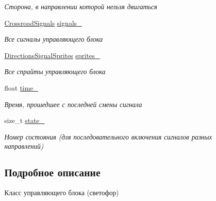 \begin{DoxyCompactItemize}
\begin{DoxyCompactList}\small\item\em Сторона, в направлении которой нельзя двигаться \end{DoxyCompactList}\item 
\mbox{\label{classrtm_1_1_control_unit_aace48a89b42ac67686c879c5ae61023d}} 
\hyperlink{namespacertm_afa6df86cef8e2ebcc053ad994e440354}{Crossroad\+Signals} \hyperlink{classrtm_1_1_control_unit_aace48a89b42ac67686c879c5ae61023d}{signals\+\_\+}
\begin{DoxyCompactList}\small\item\em Все сигналы управляющего блока \end{DoxyCompactList}\item 
\mbox{\label{classrtm_1_1_control_unit_a907c89505cfec93598b95c7b3e7c4664}} 
\hyperlink{namespacertm_ac9f276c8ed33ee992eb1a1f04a8254a0}{Directions\+Signal\+Sprites} \hyperlink{classrtm_1_1_control_unit_a907c89505cfec93598b95c7b3e7c4664}{sprites\+\_\+}
\begin{DoxyCompactList}\small\item\em Все спрайты управляющего блока \end{DoxyCompactList}\item 
\mbox{\label{classrtm_1_1_control_unit_a1496bfa46e8d33577118271087235e4d}} 
float \hyperlink{classrtm_1_1_control_unit_a1496bfa46e8d33577118271087235e4d}{time\+\_\+}
\begin{DoxyCompactList}\small\item\em Время, прошедшее с последней смены сигнала \end{DoxyCompactList}\item 
\mbox{\label{classrtm_1_1_control_unit_ac5da371e562f8be0aa5529a80cb866b7}} 
size\+\_\+t \hyperlink{classrtm_1_1_control_unit_ac5da371e562f8be0aa5529a80cb866b7}{state\+\_\+}
\begin{DoxyCompactList}\small\item\em Номер состояния (для последовательного включения сигналов разных направлений) \end{DoxyCompactList}\end{DoxyCompactItemize}


\subsection{Подробное описание}
Класс управляющего блока (светофор) 

